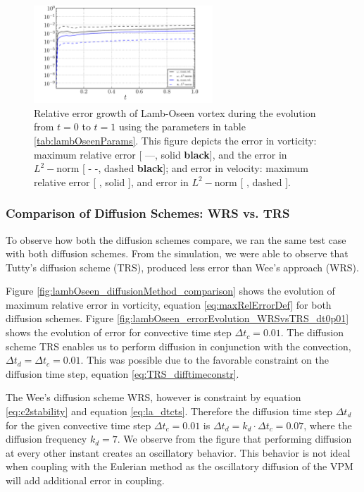 	\begin{figure}[!t]
	\centering
	\includegraphics[width=0.6\textwidth]{figures/lagrangian/lambOseen_errorEvolution_TRS_dt0p01.pdf}
	\caption{Relative error growth of Lamb-Oseen vortex during the evolution from $t=0$ to $t=1$ using the parameters in table \ref{tab:lambOseenParams}. This figure depicts the error in vorticity: maximum relative error [ ---, solid \textbf{black}], and the error in $L^2-\mathrm{norm}$ [ - -, dashed \textbf{black}]; and error in velocity: maximum relative error [ {\color{plotBlue}{---}}, solid {}], and error in $L^2-\mathrm{norm}$ [ {\color{plotBlue}{- -}}, dashed {}].}
	\label{fig:lambOseen_convection_errorGrowth_compressed}
	\end{figure}
	
\subsubsection{Comparison of Diffusion Schemes: WRS vs. TRS}
\label{subsubsec:comp_wrs_trs}
To observe how both the diffusion schemes compare, we ran the same test case with both diffusion schemes. From the simulation, we were able to observe that Tutty's diffusion scheme (TRS), produced less error than Wee's approach (WRS). 

Figure \ref{fig:lambOseen_diffusionMethod_comparison} shows the evolution of maximum relative error in vorticity, equation \ref{eq:maxRelErrorDef} for both diffusion schemes. Figure \ref{fig:lambOseen_errorEvolution_WRSvsTRS_dt0p01} shows the evolution of error for convective time step $\Delta t_c = 0.01$. The diffusion scheme TRS enables us to perform diffusion in conjunction with the convection, $\Delta t_d = \Delta t_c = 0.01$. This was possible due to the favorable constraint on the diffusion time step, equation \ref{eq:TRS_difftimeconstr}.

The Wee's diffusion scheme WRS, however is constraint by equation \ref{eq:c2stability} and equation \ref{eq:la_dtcts}. Therefore the diffusion time step $\Delta t_d$ for the given convective time step $\Delta t_c = 0.01$ is $\Delta t_d = k_d \cdot \Delta t_c = 0.07$, where the diffusion frequency $k_d=7$. We observe from the figure that performing diffusion at every other instant creates an oscillatory behavior. This behavior is not ideal when coupling with the Eulerian method as the oscillatory diffusion of the VPM will add additional error in coupling.

